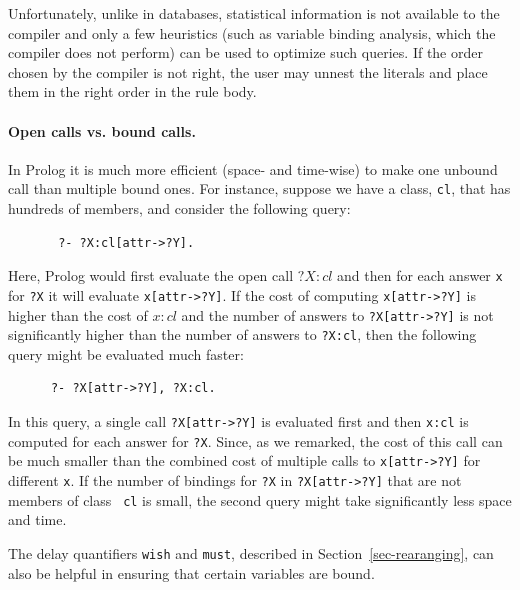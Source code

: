 \documentclass[11pt]{article}
\newcommand{\ERGO}{\mbox{\smaller{\ensuremath{\cal{E}}\smaller{{\sc{RGO}}}}}\xspace}
\newcommand{\FLSYSTEM}{\ERGO}
\begin{document}
Unfortunately, unlike in databases, statistical information is not
available to the \FLSYSTEM compiler and only a few heuristics (such as
variable binding analysis, which the compiler does not perform) can be used
to optimize such queries. If the order chosen by the compiler is not right,
the user may unnest the literals and place them in the right
order in the rule body.

\paragraph{Open calls vs. bound calls.}
In Prolog it is much more efficient (space- and
time-wise) to make one unbound call than multiple bound ones. For instance,
suppose we have a class, {\tt cl}, that has hundreds of members, and
consider the following query:
\begin{verbatim}
       ?- ?X:cl[attr->?Y].  
\end{verbatim}
Here, Prolog would first evaluate the open call $?X:cl$ and then for each
answer {\tt x} for {\tt ?X} it will evaluate {\tt x[attr->?Y]}.
If the cost of computing {\tt x[attr->?Y]} is higher than the cost of $x:cl$
and the number of answers to {\tt ?X[attr->?Y]} is not significantly
higher than the number of answers to {\tt ?X:cl}, then the following query
might be evaluated much faster:
\begin{verbatim}
      ?- ?X[attr->?Y], ?X:cl.  
\end{verbatim}
In this query, a single call {\tt ?X[attr->?Y]} is evaluated first and then
{\tt x:cl} is computed for each answer for {\tt ?X}.  Since, as we remarked,
the cost of this call can be much smaller than the combined cost of
multiple calls to {\tt x[attr->?Y]} for different {\tt x}.  If the number of
bindings for {\tt ?X} in {\tt ?X[attr->?Y]} that are not members of class {\tt
  cl} is small, the second query might take significantly less space and
time.

The delay quantifiers \texttt{wish} and \texttt{must}, described in
Section~\ref{sec-rearanging}, can also be helpful
in ensuring that certain variables are bound.  
\end{document}
